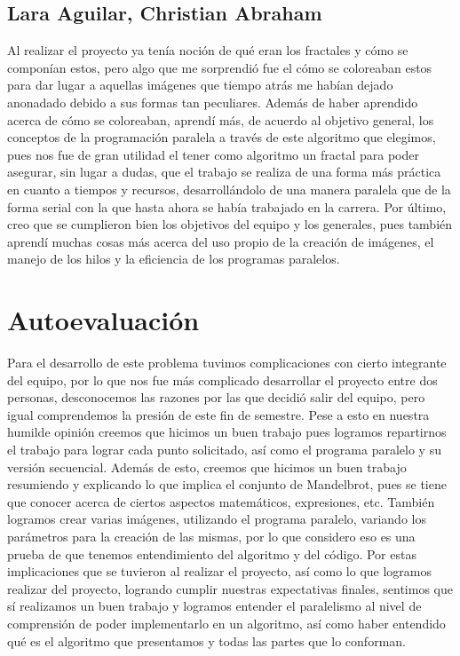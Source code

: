 \documentclass[12pt,a4paper]{article}
\begin{document}
		\subsection{Lara Aguilar, Christian Abraham}
			Al realizar el proyecto ya tenía noción de qué eran los fractales y cómo se componían estos, pero algo que me sorprendió fue el cómo se coloreaban estos para dar lugar a aquellas imágenes que tiempo atrás me habían dejado anonadado debido a sus formas tan peculiares. Además de haber aprendido acerca de cómo se coloreaban, aprendí más, de acuerdo al objetivo general, los conceptos de la programación paralela a través de este algoritmo que elegimos, pues nos fue de gran utilidad el tener como algoritmo un fractal para poder asegurar, sin lugar a dudas, que el trabajo se realiza de una forma más práctica en cuanto a tiempos y recursos, desarrollándolo de una manera paralela que de la forma serial con la que hasta ahora se había trabajado en la carrera. Por último, creo que se cumplieron bien  los objetivos del equipo y los generales, pues también aprendí muchas cosas más acerca del uso propio de la creación de imágenes, el manejo de los hilos y la eficiencia de los programas paralelos.
			
	\section{Autoevaluación}
		
		Para el desarrollo de este problema tuvimos complicaciones con cierto integrante del equipo, por lo que nos fue más complicado desarrollar el proyecto entre dos personas, desconocemos las razones por las que decidió salir del equipo, pero igual comprendemos la presión de este fin de semestre. Pese a esto en nuestra humilde opinión creemos que hicimos un buen trabajo pues logramos repartirnos el trabajo para lograr cada punto solicitado, así como el programa paralelo y su versión secuencial. Además de esto, creemos que hicimos un buen trabajo resumiendo y explicando lo que implica el conjunto de Mandelbrot, pues se tiene que conocer acerca de ciertos aspectos matemáticos, expresiones, etc. También logramos crear varias imágenes, utilizando el programa paralelo, variando los parámetros para la creación de las mismas, por lo que considero eso es una prueba de que tenemos entendimiento del algoritmo y del código. Por estas implicaciones que se tuvieron al realizar el proyecto, así como lo que logramos realizar del proyecto, logrando cumplir nuestras expectativas finales, sentimos que sí realizamos un buen trabajo y logramos entender el paralelismo al nivel de comprensión de poder implementarlo en un algoritmo, así como haber entendido qué es el algoritmo que presentamos y todas las partes que lo conforman.
	
\end{document}
